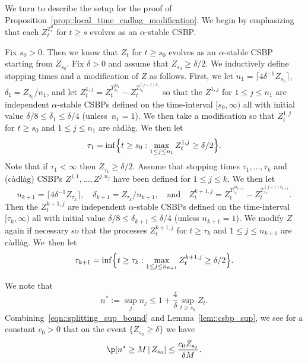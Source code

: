 \documentclass[JEP,XML,SOM,Unicode]{cedram}
\theoremstyle{plain}
\numberwithin{theorem}{section}
\theoremstyle{definition}
\newcommand{\cadlag}{càdlàg}
\newcommand{\giv}{\,|\,}
\begin{document}
We turn to describe the setup for the proof of Proposition~\ref{prop::local_time_cadlag_modification}. We begin by emphasizing that each $Z_t^{T_s^u}$ for $t \geq s$ evolves as an $\alpha$-stable CSBP.

Fix $s_0 > 0$. Then we know that $Z_t$ for $t \geq s_0$ evolves as an $\alpha$-stable CSBP starting from $Z_{s_0}$. Fix $\delta > 0$ and assume that $Z_{s_0} \geq \delta/2$. We inductively define stopping times and a modification of $Z$ as follows. First, we let $n_1 = \lceil 4\delta^{-1} Z_{s_0} \rceil$, $\delta_1 = Z_{s_0} / n_1$, and let $Z_t^{1,j} = Z_t^{T_{s_0}^{j\delta_1}} - Z_t^{T_{s_0}^{(j-1)\delta_1}}$ so that the $Z^{1,j}$ for $1 \leq j \leq n_1$ are independent $\alpha$-stable CSBPs defined on the time-interval $[s_0,\infty)$ all with initial value $\delta/8 \leq \delta_1 \leq \delta/4$ \hbox{(unless $n_1 = 1$)}. We then take a modification so that $Z_t^{1,j}$ for $t \geq s_0$ and $1 \leq j \leq n_1$ are {\cadlag}. We then let
\[
\tau_1 = \inf\Bigl\{t \geq s_0 : \max_{1 \leq j \leq n_1} Z_t^{1,j} \geq \delta/2 \Bigr\}.
\]
Note that if $\tau_1 < \infty$ then $Z_{\tau_1} \geq \delta/2$.
Assume that stopping times $\tau_1,\ldots,\tau_k$ and (\cadlag) CSBPs $Z^{j,1},\ldots,Z^{j,n_j}$ have been defined for $1 \leq j \leq k$. We then let
\[
n_{k+1} = \lceil 4 \delta^{-1} Z_{\tau_k} \rceil,\quad \delta_{k+1} = Z_{\tau_k} / n_{k+1},\quad \text{and}\quad Z_t^{k+1,j} = Z_t^{T_{\tau_k}^{j \delta_{k+1}}} - Z_t^{T_{\tau_k}^{(j-1)\delta_{k+1}}}.
\]
Then the $Z_t^{k+1,j}$ are independent $\alpha$-stable CSBPs defined on the time-interval $[\tau_k,\infty)$ all with initial value $\delta/8 \leq \delta_{k+1} \leq \delta/4$ (unless $n_{k+1} = 1$). We modify $Z$ again if necessary so that the processes $Z_t^{k+1,j}$ for $t \geq \tau_k$ and $1 \leq j \leq n_{k+1}$ are {\cadlag}. We~then let
\[
\tau_{k+1} = \inf\Bigl\{t \geq \tau_k : \max_{1 \leq j \leq n_{k+1}} Z_t^{k+1,j} \geq \delta/2 \Bigr\}.
\]

We note that
\begin{equation}
\label{eqn::splitting_sup_bound}
n^* := \sup_j n_j \leq 1+ \frac{4}{\delta} \sup_{t \geq s_0} Z_t.
\end{equation}
Combining~\eqref{eqn::splitting_sup_bound} and Lemma~\ref{lem::csbp_sup}, we see for a constant $c_0 > 0$ that on the event $\{Z_{s_0} \geq \delta\}$ we have
\begin{equation}
\label{eqn::splitting_bound}
\p[n^* \geq M \giv Z_{s_0}] \leq \frac{c_0 Z_{s_0}}{\delta M}.
\end{equation}
\end{document}
